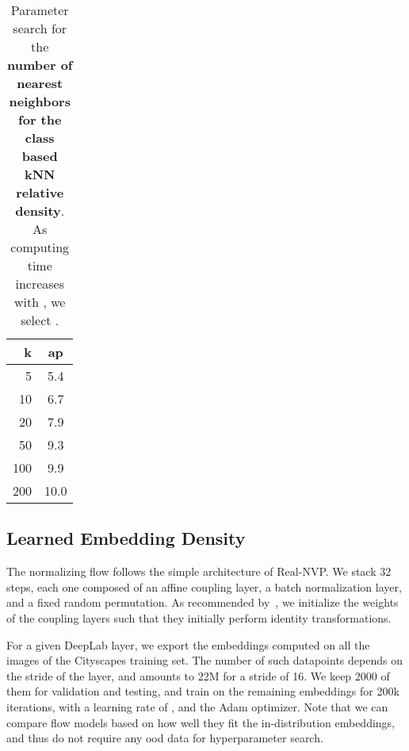 \begin{table}[htb]
\centering
\footnotesize
\begin{tabular}{rc}
\toprule
k & \ac{ap} \\
\midrule
      5  & 5.4\\
      10 & 6.7 \\
      20 & 7.9\\
      50 & 9.3 \\
      100 & 9.9\\
      200 & 10.0\\
\bottomrule
\end{tabular}
\vspace{3mm}
\caption{Parameter search for the \textbf{number of nearest neighbors for the class based kNN relative density}. As computing time increases with , we select .}
\label{tab:classknn-k}
\end{table}

\subsection{Learned Embedding Density}
\label{sec:appendix:methods:learned-embedding-density}

 The normalizing flow follows the simple architecture of Real-NVP. We stack 32 steps, each one composed of an affine coupling layer, a batch normalization layer, and a fixed random permutation. As recommended by~\cite{Kingma2018-jp}, we initialize the weights of the coupling layers such that they initially perform identity transformations.

 For a given DeepLab layer, we export the embeddings computed on all the images of the Cityscapes training set. The number of such datapoints depends on the stride of the layer, and amounts to 22M for a stride of 16. We keep 2000 of them for validation and testing, and train on the remaining embeddings for 200k iterations, with a learning rate of , and the Adam optimizer. Note that we can compare flow models based on how well they fit the in-distribution embeddings, and thus do not require any \ac{ood} data for hyperparameter search.

